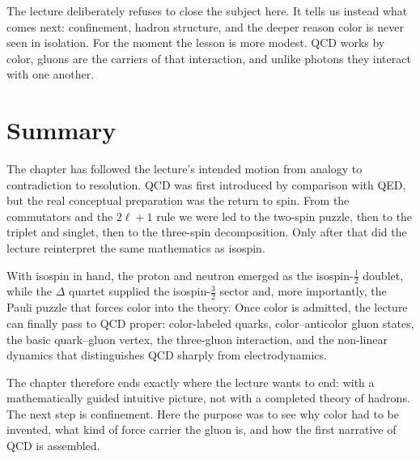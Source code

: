 The lecture deliberately refuses to close the subject here. It tells us instead what comes next: confinement, hadron structure, and the deeper reason color is never seen in isolation. For the moment the lesson is more modest. QCD works by color, gluons are the carriers of that interaction, and unlike photons they interact with one another.

\section{Summary}

The chapter has followed the lecture's intended motion from analogy to contradiction to resolution. QCD was first introduced by comparison with QED, but the real conceptual preparation was the return to spin. From the commutators and the \(2\ell+1\) rule we were led to the two-spin puzzle, then to the triplet and singlet, then to the three-spin decomposition. Only after that did the lecture reinterpret the same mathematics as isospin.

With isospin in hand, the proton and neutron emerged as the isospin-\(\tfrac12\) doublet, while the \(\Delta\) quartet supplied the isospin-\(\tfrac32\) sector and, more importantly, the Pauli puzzle that forces color into the theory. Once color is admitted, the lecture can finally pass to QCD proper: color-labeled quarks, color--anticolor gluon states, the basic quark--gluon vertex, the three-gluon interaction, and the non-linear dynamics that distinguishes QCD sharply from electrodynamics.

The chapter therefore ends exactly where the lecture wants to end: with a mathematically guided intuitive picture, not with a completed theory of hadrons. The next step is confinement. Here the purpose was to see why color had to be invented, what kind of force carrier the gluon is, and how the first narrative of QCD is assembled.